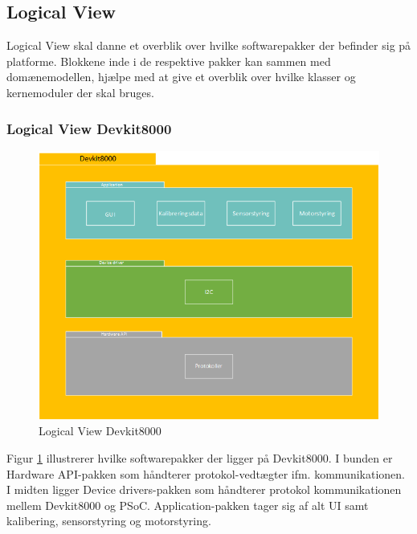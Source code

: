 \subsection{Logical View}
Logical View skal danne et overblik over hvilke softwarepakker der befinder sig på platforme. Blokkene inde i de respektive pakker kan sammen med domænemodellen, hjælpe med at give et overblik over hvilke klasser og kernemoduler der skal bruges.
\subsubsection{Logical View Devkit8000}
\begin{figure}[H] \centering
    \includegraphics[width=\textwidth]{0_Filer/Figuer/LogicalViewDevkit8000.png}
    \caption{Logical View Devkit8000}
    \label{fig:LogicalView}
\end{figure}
Figur \ref{fig:LogicalView} illustrerer hvilke softwarepakker der ligger på Devkit8000. I bunden er Hardware API-pakken som håndterer protokol-vedtægter ifm. kommunikationen. I midten ligger Device drivers-pakken som håndterer protokol kommunikationen mellem Devkit8000 og PSoC. Application-pakken tager sig af alt UI samt kalibering, sensorstyring og motorstyring.

